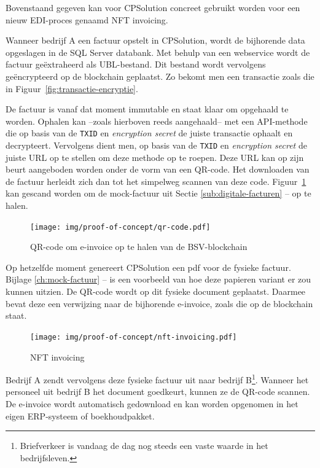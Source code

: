 Bovenstaand gegeven kan voor CPSolution concreet gebruikt worden voor een nieuw EDI-proces genaamd NFT invoicing.

Wanneer bedrijf A een factuur opstelt in CPSolution, wordt de bijhorende data opgeslagen in de SQL Server databank. Met behulp van een webservice wordt de factuur geëxtraheerd als UBL-bestand. Dit bestand wordt vervolgens geëncrypteerd op de blockchain geplaatst. Zo bekomt men een transactie zoals die in Figuur~\ref{fig:transactie-encryptie}. 

De factuur is vanaf dat moment immutable en staat klaar om opgehaald te worden. Ophalen kan --zoals hierboven reeds aangehaald-- met een API-methode die op basis van de \verb|TXID| en \textit{encryption secret} de juiste transactie ophaalt en decrypteert. Vervolgens dient men, op basis van de \verb|TXID| en \textit{encryption secret} de juiste URL op te stellen om deze methode op te roepen. Deze URL kan op zijn beurt aangeboden worden onder de vorm van een QR-code. Het downloaden van de factuur herleidt zich dan tot het simpelweg scannen van deze code. Figuur~\ref{fig:qr-code} kan gescand worden om de mock-factuur uit Sectie \ref{sub:digitale-facturen} --  op te halen.

\begin{figure}[H]
	\centering
	\texttt{[image: img/proof-of-concept/qr-code.pdf]}
	\caption{\label{fig:qr-code}QR-code om e-invoice op te halen van de BSV-blockchain}
\end{figure}

Op hetzelfde moment genereert CPSolution een pdf voor de fysieke factuur. Bijlage \ref{ch:mock-factuur} --  is een voorbeeld van hoe deze papieren variant er zou kunnen uitzien. De QR-code wordt op dit fysieke document geplaatst. Daarmee bevat deze een verwijzing naar de bijhorende e-invoice, zoals die op de blockchain staat.

\begin{figure}[H]
	\centering
	\texttt{[image: img/proof-of-concept/nft-invoicing.pdf]}
	\caption{\label{fig:nft-invoicing}NFT invoicing}
\end{figure}

Bedrijf A zendt vervolgens deze fysieke factuur uit naar bedrijf B\footnote{Briefverkeer is vandaag de dag nog steeds een vaste waarde in het bedrijfsleven.}. Wanneer het personeel uit bedrijf B het document goedkeurt, kunnen ze de QR-code scannen. De e-invoice wordt automatisch gedownload en kan worden opgenomen in het eigen ERP-systeem of boekhoudpakket. 

